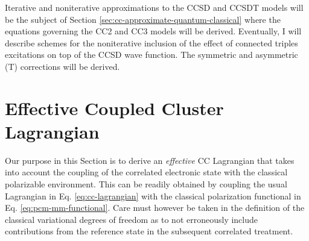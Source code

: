 Iterative and noniterative approximations to the \acrshort{CCSD} and
\acrshort{CCSDT} models will be the subject of Section
\ref{sec:cc-approximate-quantum-classical} where the equations governing
the \acrshort{CC2} and \acrshort{CC3} models will be derived.
Eventually, I will describe schemes for the noniterative inclusion of
the effect of connected triples excitations on top of the
\acrshort{CCSD} wave function.
The symmetric and asymmetric (T) corrections will be derived.

\section{Effective Coupled Cluster Lagrangian}
\label{sec:effective-cc-lagrangian}

Our purpose in this Section is to derive an \emph{effective} \acrshort{CC}
Lagrangian that takes into account the coupling of the correlated
electronic state with the classical polarizable
environment.
This can be readily obtained\autocite{Lipparini2016-mo} by coupling the
usual Lagrangian in Eq. \eqref{eq:cc-lagrangian} with the classical
polarization functional in Eq. \eqref{eq:pcm-mm-functional}.
Care must however be taken in the definition of the classical
variational degrees of freedom as to not erroneously include
contributions from the reference state in the subsequent correlated
treatment.

